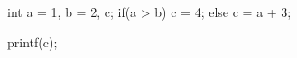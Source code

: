 \begin{minipage}[t]{2.5in}
\begin{AVerb}[numbers=left]
int a = 1, b = 2, c;
if(a > b) 
  c = 4;
else     
  c = a + 3;

printf(c);
\end{AVerb}
\end{minipage}
